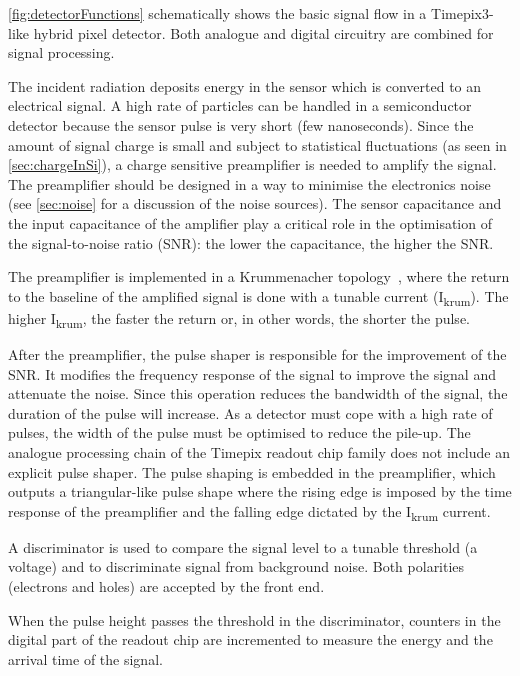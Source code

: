 \cref{fig:detectorFunctions} schematically shows the basic signal flow
in a Timepix3-like hybrid pixel detector. Both analogue and digital
circuitry are combined for signal processing.

The incident radiation deposits energy in the sensor which is
converted to an electrical signal. A high rate of particles can be
handled in a semiconductor detector because the sensor pulse is very
short (few nanoseconds). Since the amount of signal charge is small
and subject to statistical fluctuations (as seen in
\cref{sec:chargeInSi}), a charge sensitive preamplifier is needed to
amplify the signal. The preamplifier should be designed in a way to
minimise the electronics noise (see \cref{sec:noise} for a discussion
of the noise sources). The sensor capacitance and the input
capacitance of the amplifier play a critical role in the optimisation
of the signal-to-noise ratio (SNR): the lower the capacitance, the
higher the SNR.

The preamplifier is implemented in a Krummenacher
topology~\cite{KRUMMENACHER1991527}, where the return to the baseline
of the amplified signal is done with a tunable current
(I\textsubscript{krum}). The higher I\textsubscript{krum}, the faster
the return or, in other words, the shorter the pulse.

After the preamplifier, the pulse shaper is responsible for the
improvement of the SNR. It modifies the frequency response of the
signal to improve the signal and attenuate the noise. Since this
operation reduces the bandwidth of the signal, the duration of the
pulse will increase. As a detector must cope with a high rate of
pulses, the width of the pulse must be optimised to reduce the
pile-up. The analogue processing chain of the Timepix readout chip
family does not include an explicit pulse shaper. The pulse shaping is
embedded in the preamplifier, which outputs a triangular-like pulse
shape where the rising edge is imposed by the time response of the
preamplifier and the falling edge dictated by the
I\textsubscript{krum} current.

A discriminator is used to compare the signal level to a tunable
threshold (a voltage) and to discriminate signal from background
noise. Both polarities (electrons and holes) are accepted by the front
end.

When the pulse height passes the threshold in the discriminator,
counters in the digital part of the readout chip are incremented to
measure the energy and the arrival time of the signal.

